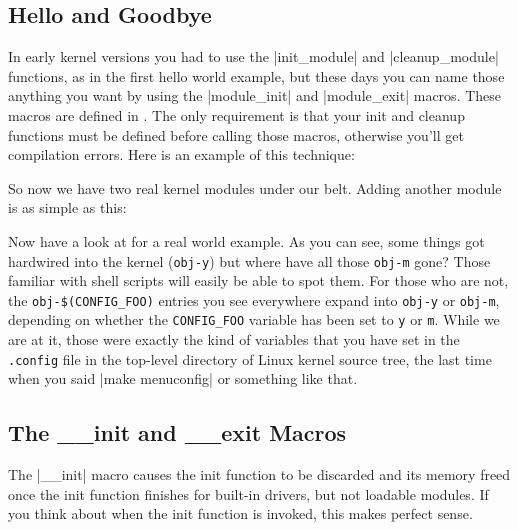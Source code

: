 \documentclass[10pt, oneside]{book}
\begin{document}
\subsection{Hello and Goodbye}
\label{hello_n_goodbye}
In early kernel versions you had to use the \cpp|init_module| and \cpp|cleanup_module| functions, as in the first hello world example, but these days you can name those anything you want by using the \cpp|module_init| and \cpp|module_exit| macros.
These macros are defined in .
The only requirement is that your init and cleanup functions must be defined before calling those macros, otherwise you'll get compilation errors.
Here is an example of this technique:


So now we have two real kernel modules under our belt. Adding another module is as simple as this:


Now have a look at  for a real world example.
As you can see, some things got hardwired into the kernel (\verb|obj-y|) but where have all those \verb|obj-m| gone?
Those familiar with shell scripts will easily be able to spot them.
For those who are not, the \verb|obj-$(CONFIG_FOO)| entries you see everywhere expand into \verb|obj-y| or \verb|obj-m|, depending on whether the \verb|CONFIG_FOO| variable has been set to \verb|y| or \verb|m|.
While we are at it, those were exactly the kind of variables that you have set in the \verb|.config| file in the top-level directory of Linux kernel source tree, the last time when you said \sh|make menuconfig| or something like that.

\subsection{The \_\_init and \_\_exit Macros}
\label{init_n_exit}
The \cpp|__init| macro causes the init function to be discarded and its memory freed once the init function finishes for built-in drivers, but not loadable modules.
If you think about when the init function is invoked, this makes perfect sense.
\end{document}
